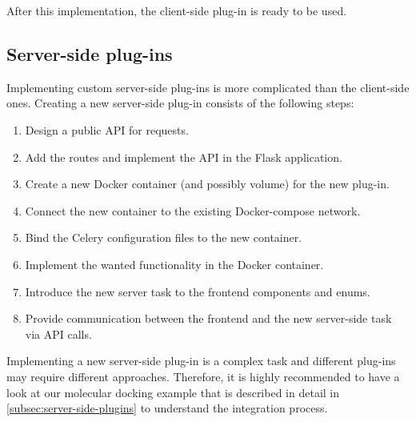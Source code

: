 After this implementation, the client-side plug-in is ready to be used.



\subsection{Server-side plug-ins}
\label{subsec:dev_server_side}

Implementing custom server-side plug-ins is more complicated than the client-side ones. Creating a new server-side plug-in consists of the following steps:

\begin{enumerate}
    \item Design a public API for requests.
    \item Add the routes and implement the API in the Flask application.
    \item Create a new Docker container (and possibly volume) for the new plug-in.
    \item Connect the new container to the existing Docker-compose network.
    \item Bind the Celery configuration files to the new container.
    \item Implement the wanted functionality in the Docker container.
    \item Introduce the new server task to the frontend components and enums.
    \item Provide communication between the frontend and the new server-side task via API calls.
\end{enumerate}

Implementing a new server-side plug-in is a complex task and different plug-ins may require different approaches. Therefore, it is highly recommended to have a look at our molecular docking example that is described in detail in \cref{subsec:server-side-plugins} to understand the integration process.
